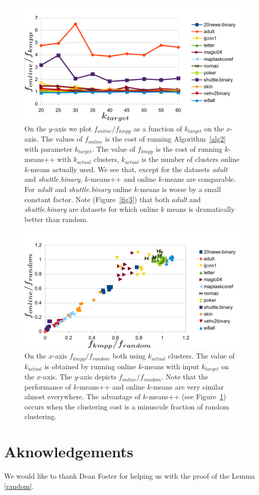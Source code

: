 \documentclass{article}
\begin{document}
\begin{figure}[htbp]
\begin{center}
\includegraphics{figures/plot4.pdf}
\caption{On the $y$-axis we plot $f_{online}/f_{kmpp}$ as a function of $k_{target}$ on the $x$-axis. The values of $f_{online}$ is the cost of running Algorithm~\ref{alg2} with parameter $k_{target}$.
The value of $f_{kmpp}$ is the cost of running $k$-means++ with $k_{actual}$ clusters, $k_{actual}$ is the number of clusters online $k$-means actually used.
We see that, except for the datasets \emph{adult} and \emph{shuttle.binary}, $k$-means++ and online $k$-means are comparable. For \emph{adult} and \emph{shuttle.binary} online $k$-means is worse by a small constant factor. Note (Figure~\ref{fig3}) that both \emph{adult} and \emph{shuttle.binary} are datasets for which online $k$ means is dramatically better than random.}
\label{fig4}
\end{center}
\end{figure}

\begin{figure}[htbp]
\begin{center}
\includegraphics{figures/plot5.pdf}
\caption{On the $x$-axis $f_{kmpp}/f_{random}$ both using $k_{actual}$ clusters. 
The value of $k_{actual}$ is obtained by running online $k$-means with input $k_{target}$ on the $x$-axis.
The $y$-axis depicts $f_{online}/f_{random}$. 
Note that the performance of $k$-means++ and online $k$-means are very similar almost everywhere.
The advantage of $k$-means++ (see Figure~\ref{fig4}) occurs when the clustering cost is a minuscule fraction of random clustering.}
\label{fig5}
\end{center}
\end{figure}
  
\section{Aknowledgements}
We would like to thank  Dean Foster for  helping us with the proof of the Lemma \ref{random}.



\end{document}
